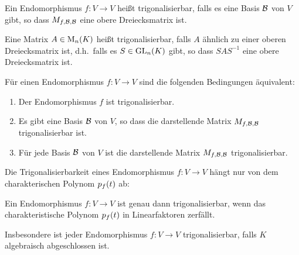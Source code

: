 \begin{definition}
  Ein Endomorphismus $f \colon V \to V$ heißt trigonalisierbar, falls es eine Basis $\mathcal{B}$ von $V$ gibt, so dass $M_{f, \mathcal{B}, \mathcal{B}}$ eine obere Dreiecksmatrix ist.
  
  Eine Matrix $A \in \operatorname{M}_{n}(K)$ heißt trigonalisierbar, falls $A$ ähnlich zu einer oberen Dreiecksmatrix ist, d.h.\ falls es $S \in \operatorname{GL}_{n}(K)$ gibt, so dass $S A S^{-1}$ eine obere Dreiecksmatrix ist.
\end{definition}

\begin{lemma}
  Für einen Endomorphismus $f \colon V \to V$ sind die folgenden Bedingungen äquivalent:
  \begin{enumerate}
    \item
      Der Endomorphismus $f$ ist trigonalisierbar.
    \item
      Es gibt eine Basis $\mathcal{B}$ von $V$, so dass die darstellende Matrix $M_{f, \mathcal{B}, \mathcal{B}}$ trigonalisierbar ist.
    \item
      Für jede Basis $\mathcal{B}$ von $V$ ist die darstellende Matrix $M_{f, \mathcal{B}, \mathcal{B}}$ trigonalisierbar.
  \end{enumerate}
\end{lemma}

Die Trigonalisierbarkeit eines Endomorphismus $f \colon V \to V$ hängt nur von dem charakterischen Polynom $p_{f}(t)$ ab:

\begin{proposition}
  Ein Endomorphismus $f \colon V \to V$ ist genau dann trigonalisierbar, wenn das charakteristische Polynom $p_{f}(t)$ in Linearfaktoren zerfällt.
\end{proposition}

Insbesondere ist jeder Endomorphismus $f \colon V \to V$ trigonalisierbar, falls $K$ algebraisch abgeschlossen ist.




